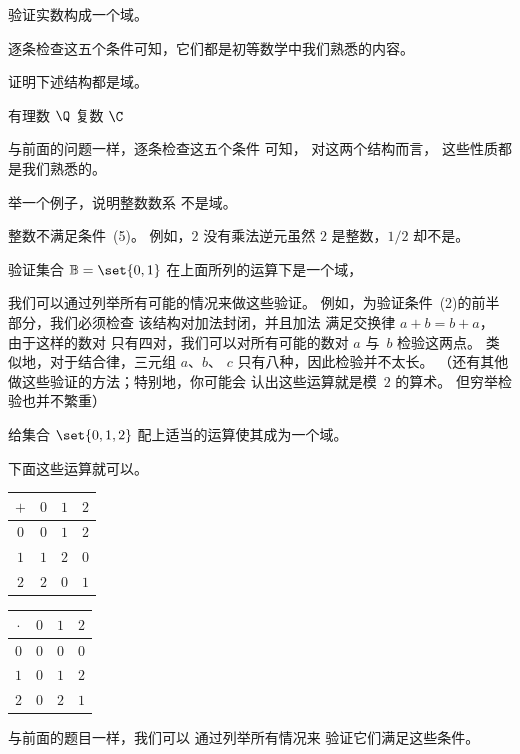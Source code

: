\begin{exercises}
  \item 
    验证实数构成一个域。
    \begin{answer}
      逐条检查这五个条件可知，它们都是初等数学中我们熟悉的内容。
    \end{answer}
  \item 
    证明下述结构都是域。
    \begin{exparts*}
       \partsitem 有理数 $\Q$
       \partsitem 复数 $\C$
    \end{exparts*}
    \begin{answer}
      与前面的问题一样，逐条检查这五个条件
      可知，
      对这两个结构而言，
      这些性质都是我们熟悉的。
    \end{answer}
  \item 
     举一个例子，说明整数数系
     不是域。
     \begin{answer}
       整数不满足条件~(5)。
       例如，$2$ 没有乘法逆元\Dash 虽然
       $2$ 是整数，$1/2$ 却不是。
     \end{answer}
  \item \label{exer:BinField} 
     验证集合 $\mathbb{B}=\set{0,1}$ 在上面所列的运算下是一个域，
     \begin{answer}
       我们可以通过列举所有可能的情况来做这些验证。
       例如，为验证条件~(2)的前半部分，我们必须检查
       该结构对加法封闭，并且加法
       满足交换律 $a+b=b+a$，
       由于这样的数对
       只有四对，我们可以对所有可能的数对 $a$ 与~$b$ 检验这两点。
       类似地，对于结合律，三元组 $a$、$b$、
       $c$ 只有八种，因此检验并不太长。
       （还有其他做这些验证的方法；特别地，你可能会
       认出这些运算就是模~$2$ 的算术。
       但穷举检验也并不繁重）
     \end{answer}
  \item 
     给集合 $\set{0,1,2}$
     配上适当的运算使其成为一个域。     
     \begin{answer}
       下面这些运算就可以。
       \begin{center}
          \begin{tabular}{c|ccc}
             \( + \) &\( 0 \) &\( 1 \) &$2$ \\
             \hline
             \( 0 \) &\( 0 \) &\( 1 \) &$2$ \\
             \( 1 \) &\( 1 \) &\( 2 \) &$0$ \\
             $2$     &$2$     &$0$     &$1$
          \end{tabular}
          \qquad
          \begin{tabular}{c|ccc}
            \( \cdot \) &\( 0 \) &\( 1 \) &$2$ \\
            \hline
            \( 0 \)  &\( 0 \) &\( 0 \) &$0$ \\
            \( 1 \)  &\( 0 \) &\( 1 \) &$2$ \\
            $2$      &$0$     &$2$     &$1$
          \end{tabular}
       \end{center}
       与前面的题目一样，我们可以
       通过列举所有情况来
       验证它们满足这些条件。
     \end{answer}
\end{exercises}
%
%
